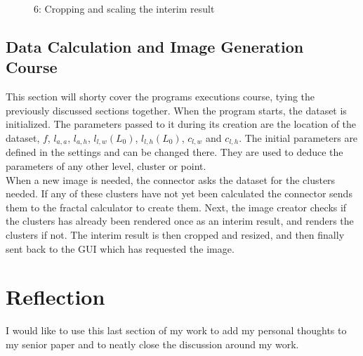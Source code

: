 \documentclass[12pt,a4paper,titlepage]{article}
\begin{document}
\begin{figure}
\begin{minipage}{.4\textwidth}
		\end{minipage}
		\begin{minipage}{.4\textwidth}
			\centering
			\caption*{6: Cropping and scaling the interim result}
		\end{minipage}
	\end{figure}
	\subsection{Data Calculation and Image Generation Course}
	This section will shorty cover the programs executions course, tying the previously discussed sections together. When the program starts, the dataset is initialized. The parameters passed to it during its creation are the location of the dataset, \(f\), \(l_{a,a}\), \(l_{a,h}\), \(l_{l,w}(L_0)\), \(l_{l,h}(L_0)\), \(c_{l,w}\) and \(c_{l,h}\). The initial parameters are defined in the settings and can be changed there. They are used to deduce the parameters of any other level, cluster or point.\\
	When a new image is needed, the connector asks the dataset for the clusters needed. If any of these clusters have not yet been calculated the connector sends them to the fractal calculator to create them. Next, the image creator checks if the clusters has already been rendered once as an interim result, and renders the clusters if not. The interim result is then cropped and resized, and then finally sent back to the GUI which has requested the image.
	\section{Reflection}
	I would like to use this last section of my work to add my personal thoughts to my senior paper and to neatly close the discussion around my work.
\end{document}
